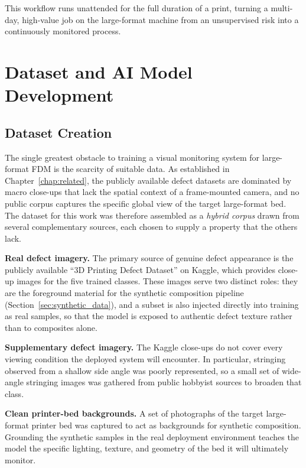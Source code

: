 \documentclass[english, Lau, oneside]{sapthesis}
\begin{document}
This workflow runs unattended for the full duration of a print, turning a multi-day, high-value job on the large-format machine from an unsupervised risk into a continuously monitored process.

\chapter{Dataset and AI Model Development}
\label{chap:model}

\section{Dataset Creation}
The single greatest obstacle to training a visual monitoring system for large-format FDM is the scarcity of suitable data. As established in Chapter~\ref{chap:related}, the publicly available defect datasets are dominated by macro close-ups that lack the spatial context of a frame-mounted camera, and no public corpus captures the specific global view of the target large-format bed. The dataset for this work was therefore assembled as a \textit{hybrid corpus} drawn from several complementary sources, each chosen to supply a property that the others lack.

\textbf{Real defect imagery.} The primary source of genuine defect appearance is the publicly available ``3D Printing Defect Dataset'' on Kaggle, which provides close-up images for the five trained classes. These images serve two distinct roles: they are the foreground material for the synthetic composition pipeline (Section~\ref{sec:synthetic_data}), and a subset is also injected directly into training as real samples, so that the model is exposed to authentic defect texture rather than to composites alone.

\textbf{Supplementary defect imagery.} The Kaggle close-ups do not cover every viewing condition the deployed system will encounter. In particular, stringing observed from a shallow side angle was poorly represented, so a small set of wide-angle stringing images was gathered from public hobbyist sources to broaden that class.

\textbf{Clean printer-bed backgrounds.} A set of photographs of the target large-format printer bed was captured to act as backgrounds for synthetic composition. Grounding the synthetic samples in the real deployment environment teaches the model the specific lighting, texture, and geometry of the bed it will ultimately monitor.
\end{document}
